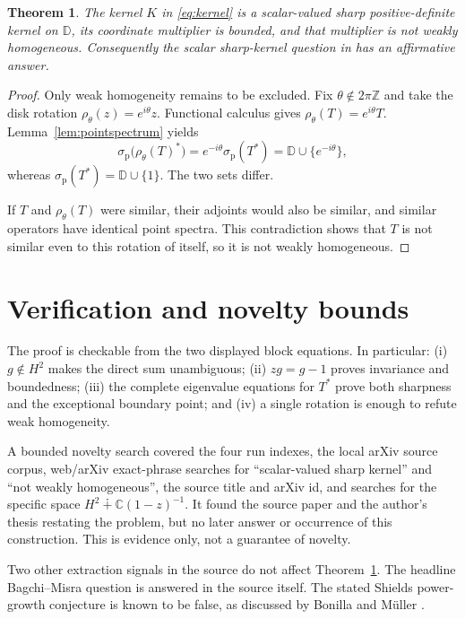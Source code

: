 \documentclass[11pt]{article}
\newtheorem{theorem}{Theorem}
\newcommand{\D}{\mathbb D}
\newcommand{\C}{\mathbb C}
\begin{document}
\begin{theorem}\label{thm:main}
The kernel $K$ in \eqref{eq:kernel} is a scalar-valued sharp positive-definite
kernel on $\D$, its coordinate multiplier is bounded, and that multiplier is
not weakly homogeneous.  Consequently the scalar sharp-kernel question in
\cite[Section 3, p.~8]{Ghara} has an affirmative answer.
\end{theorem}

\begin{proof}
Only weak homogeneity remains to be excluded.  Fix
$\theta\notin2\pi\mathbb Z$ and take the disk rotation
$\rho_\theta(z)=e^{i\theta}z$.  Functional calculus gives
$\rho_\theta(T)=e^{i\theta}T$.  Lemma~\ref{lem:pointspectrum} yields
\[
 \sigma_{\mathrm p}\bigl(\rho_\theta(T)^*\bigr)
 =e^{-i\theta}\sigma_{\mathrm p}(T^*)
 =\D\cup\{e^{-i\theta}\},
\]
whereas $\sigma_{\mathrm p}(T^*)=\D\cup\{1\}$.  The two sets differ.

If $T$ and $\rho_\theta(T)$ were similar, their adjoints would also be
similar, and similar operators have identical point spectra.  This
contradiction shows that $T$ is not similar even to this rotation of itself,
so it is not weakly homogeneous.
\end{proof}

\section{Verification and novelty bounds}

The proof is checkable from the two displayed block equations.  In
particular: (i) $g\notin H^2$ makes the direct sum unambiguous; (ii) $zg=g-1$
proves invariance and boundedness; (iii) the complete eigenvalue equations for
$T^*$ prove both sharpness and the exceptional boundary point; and (iv) a
single rotation is enough to refute weak homogeneity.

A bounded novelty search covered the four run indexes, the local arXiv source
corpus, web/arXiv exact-phrase searches for ``scalar-valued sharp kernel'' and
``not weakly homogeneous'', the source title and arXiv id, and searches for
the specific space $H^2\dotplus\C(1-z)^{-1}$.  It found the source paper and
the author's thesis restating the problem, but no later answer or occurrence
of this construction.  This is evidence only, not a guarantee of novelty.

Two other extraction signals in the source do not affect Theorem~\ref{thm:main}.
The headline Bagchi--Misra question is answered in the source itself.  The
stated Shields power-growth conjecture is known to be false, as discussed by
Bonilla and M\"uller \cite{BM}.
\end{document}

